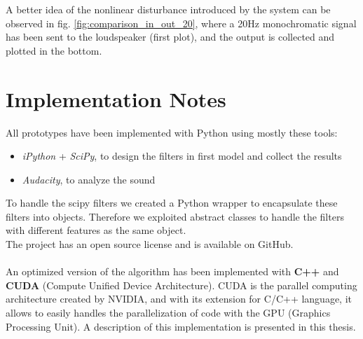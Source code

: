 A better idea of the nonlinear disturbance introduced by the system can be observed in fig. \ref{fig:comparison_in_out_20}, where a 20Hz monochromatic signal has been sent to the loudspeaker (first plot), and the output is collected and plotted in the bottom.\\

\section{Implementation Notes}
All prototypes have been implemented with Python using mostly these tools:
\begin{itemize}
\item \textit{iPython} + \textit{SciPy}, to design the filters in first model and collect the results
\item \textit{Audacity}, to analyze the sound
\end{itemize}
To handle the scipy filters we created a Python wrapper to encapsulate these filters into objects. Therefore we exploited abstract classes to handle the filters with different features as the same object.\\
The project has an open source license and is available on GitHub.\\\\
An optimized version of the algorithm has been implemented with \textbf{C++} and \textbf{CUDA} (Compute Unified Device Architecture). CUDA is the parallel computing architecture created by NVIDIA,  and with its extension for C/C++ language, it allows to easily handles the parallelization of code with the GPU (Graphics Processing Unit).
A description of this implementation is presented in this thesis.

